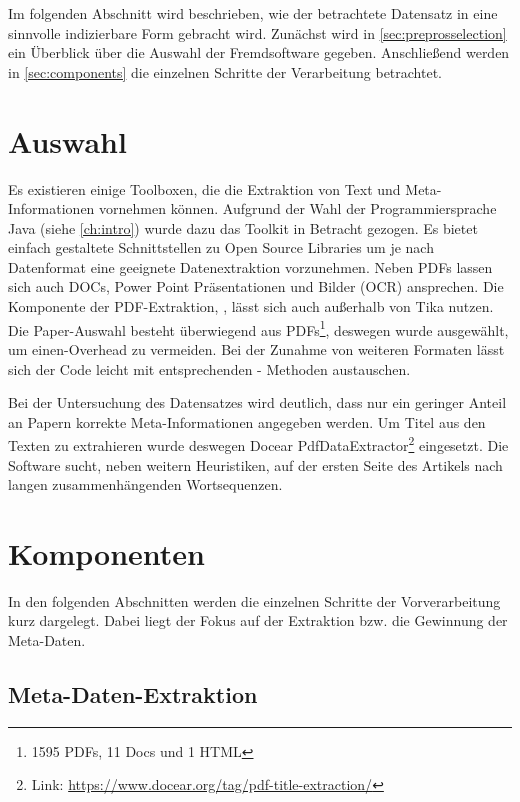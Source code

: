 
Im folgenden Abschnitt wird beschrieben, wie der betrachtete Datensatz in eine sinnvolle indizierbare Form
gebracht wird. Zunächst wird in \autoref{sec:preprosselection} ein
Überblick über die Auswahl der Fremdsoftware gegeben. Anschließend werden in
\autoref{sec:components} die einzelnen Schritte der Verarbeitung betrachtet.



\section{Auswahl}\label{sec:preprosselection}

Es existieren einige Toolboxen, die die Extraktion von Text und Meta-
Informationen vornehmen können.  Aufgrund der Wahl der
Programmiersprache Java (siehe \autoref{ch:intro}) wurde dazu das
\tika Toolkit
in Betracht gezogen. Es bietet einfach gestaltete Schnittstellen zu
Open Source Libraries um je nach Datenformat eine geeignete
Datenextraktion vorzunehmen. Neben PDFs lassen sich auch DOCs, Power
Point Präsentationen und Bilder (OCR) ansprechen. Die Komponente der
PDF-Extraktion, \pdfbox, lässt sich auch außerhalb von Tika nutzen.
Die Paper-Auswahl besteht überwiegend aus PDFs\footnote{1595 PDFs,
  11 Docs und 1 HTML}, deswegen wurde \pdfbox ausgewählt, um einen-Overhead zu
vermeiden. Bei der Zunahme von weiteren Formaten lässt sich der Code
leicht mit entsprechenden \tika - Methoden austauschen.

Bei der Untersuchung des Datensatzes wird deutlich, dass nur ein
geringer Anteil an Papern korrekte Meta-Informationen angegeben werden. Um
Titel aus den Texten zu extrahieren wurde deswegen Docear
PdfDataExtractor\footnote{Link:
  \url{https://www.docear.org/tag/pdf-title-extraction/}}
eingesetzt. Die Software sucht, neben weitern Heuristiken, auf der
ersten Seite des Artikels nach langen zusammenhängenden Wortsequenzen.




\section{Komponenten}\label{sec:components}
In den folgenden Abschnitten werden die einzelnen Schritte der
Vorverarbeitung kurz dargelegt. Dabei liegt der Fokus auf der
Extraktion bzw. die Gewinnung der Meta-Daten.

\subsection{Meta-Daten-Extraktion}\label{sec:pdfextraction}

